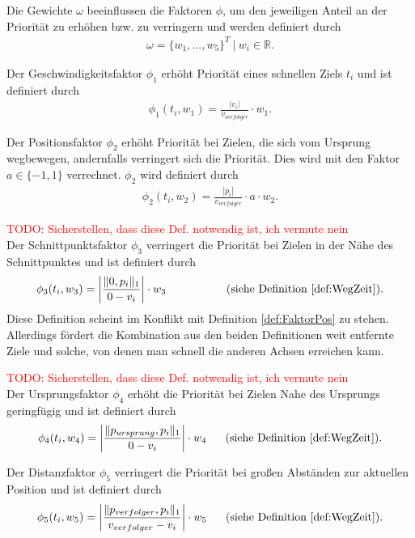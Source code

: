 \documentclass[german,version-2019-11]{uzl-thesis}
\begin{document}
\begin{definition}
Die Gewichte $\omega$ beeinflussen die Faktoren $\phi$, um den jeweiligen Anteil an der Priorität zu erhöhen bzw. zu verringern und werden definiert durch
\begin{align*}
\omega = \{w_1,...,w_5\}^T~|~w_i \in\mathbb{R}.
\end{align*}
\end{definition}
\begin{definition}
Der Geschwindigkeitsfaktor $\phi_1$ erhöht Priorität eines schnellen Ziels $t_i$ und ist definiert durch
\begin{align*}
\phi_1(t_i, w_1) = \frac{|v_i|}{v_{verfolger}}\cdot w_1.
\end{align*}
\end{definition}
\begin{definition}
\label{def:FaktorPos}
Der Positionsfaktor $\phi_2$ erhöht Priorität bei Zielen, die sich vom Ursprung wegbewegen, andernfalls verringert sich die Priorität. Dies wird mit den Faktor $a\in\{-1,1\}$ verrechnet. $\phi_2$ wird definiert durch 
\begin{align*}
\phi_2(t_i, w_2) = \frac{|p_i|}{v_{verfolger}}\cdot a \cdot w_2.
\end{align*}
\end{definition}
\begin{definition}
\textcolor{red}{TODO: Sicherstellen, dass diese Def. notwendig ist, ich vermute nein}\\
Der Schnittpunktsfaktor $\phi_3$ verringert die Priorität bei Zielen in der Nähe des Schnittpunktes und ist definiert durch
\begin{align*}
\phi_3(t_i, w_3) = \bigg\vert\frac{\|0,p_i\|_1}{0-v_i}\bigg\vert \cdot w_3 \text{~~~~~~~~~~~~~~~~(siehe Definition \ref{def:WegZeit})}.
\end{align*}
Diese Definition scheint im Konflikt mit Definition \ref{def:FaktorPos} zu stehen. Allerdings fördert die Kombination aus den beiden Definitionen weit entfernte Ziele und solche, von denen man schnell die anderen Achsen erreichen kann.
\end{definition}
\begin{definition}
\textcolor{red}{TODO: Sicherstellen, dass diese Def. notwendig ist, ich vermute nein}\\
Der Ursprungsfaktor $\phi_4$ erhöht die Priorität bei Zielen Nahe des Ursprungs geringfügig und ist definiert durch
\begin{align*}
\phi_4(t_i, w_4) = \bigg\vert\frac{\|p_{ursprung},p_i\|_1}{0-v_i}\bigg\vert \cdot w_4 \text{~~~~~(siehe Definition \ref{def:WegZeit})}.
\end{align*}
\end{definition}
\begin{definition}
Der Distanzfaktor $\phi_5$ verringert die Priorität bei großen Abständen zur aktuellen Position und ist definiert durch
\begin{align*}
\phi_5(t_i, w_5) = \bigg\vert\frac{\|p_{verfolger},p_i\|_1}{v_{verfolger}-v_i}\bigg\vert \cdot w_5 \text{~~~~~(siehe Definition \ref{def:WegZeit})}.
\end{align*}
\end{definition}
\end{document}
